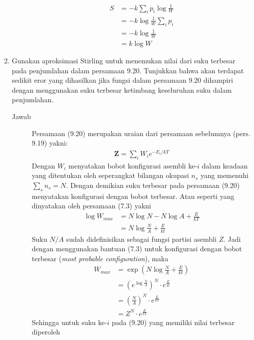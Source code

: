 \documentclass[a4paper , 12 pt]{article}
\begin{document}
\begin{enumerate}
\begin{description}
			  \begin{align}
			  	S & = -k \sum_i p_i \log \frac{1}{W}  \nonumber \\
			  	&  = -k \log \frac{1}{W} \sum_i p_i \nonumber \\
			  	& = -k \log \frac{1}{W} \nonumber \\
			  	& = k \log W \tag{QED}
			  \end{align}
		\end{description}
 	\item Gunakan aproksimasi Stirling untuk menemukan nilai dari suku terbesar pada penjumlahan dalam persamaan 9.20. Tunjukkan bahwa akan terdapat sedikit eror yang dihasilkan jika fungsi dalam persamaan 9.20 dihampiri dengan menggunakan suku  terbesar ketimbang keseluruhan suku dalam penjumlahan. 
		\begin{description}
			\item[Jawab]
			Persamaan (9.20) merupakan uraian dari persamaan sebelumnya (pers. 9.19) yakni:
			\begin{align}
				\boldsymbol{Z} = \sum_i W_i e^{-E_i/kT} \tag{iii.1}
			\end{align}
			Dengan $W_i$ menyatakan bobot konfigurasi asembli ke-$i$ dalam keadaan yang ditentukan oleh seperangkat bilangan okupasi $n_s$ yang memenuhi $\displaystyle \sum_s n_s = N$.
			Dengan demikian suku terbesar pada persamaan (9.20) menyatakan konfigurasi dengan bobot terbesar. Atau seperti yang dinyatakan  oleh persamaan (7.3) yakni
			\begin{align}
				\log W_{max} & = N \log N - N \log A + \frac{E}{kT} \nonumber \\
				& = N \log \frac{N}{A} + \frac{E}{kt} \nonumber %
			\end{align}
			Suku $N/A$ sudah didefinisikan sebagai fungsi partisi asembli $Z$. Jadi dengan menggunakan bantuan (7.3) untuk konfigurasi dengan bobot terbesar (\textit{most probable configuration}), maka %
			\begin{align}
			W_{max} &  = \exp{\left ( N \log \frac{N}{A} + \frac{E}{kt} \right )} \nonumber \\
			& = \left ( e^{\log \frac{N}{A}} \right )^N \cdot e^{\frac{E}{kt}} \nonumber \\
			& = \left( \frac{N}{A} \right) ^N \cdot e^{\frac{E}{kT}} \nonumber \\
			& = Z^N \cdot e^{\frac{E}{kT}} \tag{iii.2}
 			\end{align}
 			Sehingga untuk suku ke-$i$ pada (9.20) yang memiliki nilai terbesar diperoleh 

\end{description}
\end{enumerate}
\end{document}

